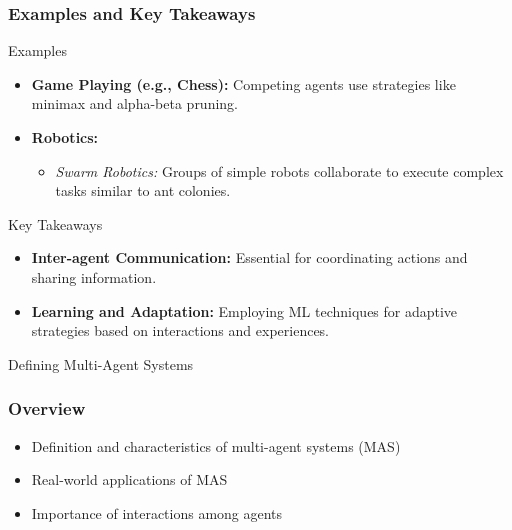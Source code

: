 \documentclass[aspectratio=169]{beamer}
\begin{document}
\begin{frame}[fragile]
    \frametitle{Examples and Key Takeaways}
    \begin{block}{Examples}
        \begin{itemize}
            \item \textbf{Game Playing (e.g., Chess):} Competing agents use strategies like minimax and alpha-beta pruning.
            \item \textbf{Robotics:} 
            \begin{itemize}
                \item \textit{Swarm Robotics:} Groups of simple robots collaborate to execute complex tasks similar to ant colonies.
            \end{itemize}
        \end{itemize}
    \end{block}
    
    \begin{block}{Key Takeaways}
        \begin{itemize}
            \item \textbf{Inter-agent Communication:} Essential for coordinating actions and sharing information.
            \item \textbf{Learning and Adaptation:} Employing ML techniques for adaptive strategies based on interactions and experiences.
        \end{itemize}
    \end{block}
\end{frame}

\begin{frame}[fragile]{Defining Multi-Agent Systems}
  \frametitle{Overview}
  \begin{itemize}
    \item Definition and characteristics of multi-agent systems (MAS)
    \item Real-world applications of MAS
    \item Importance of interactions among agents
  \end{itemize}
\end{frame}
\end{document}
